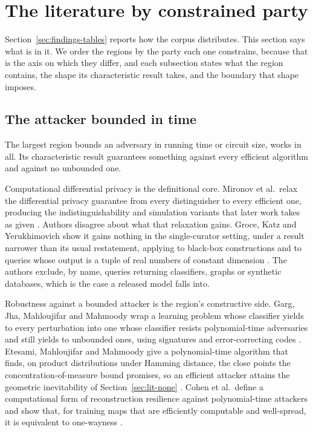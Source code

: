 \section{The literature by constrained party}
\label{sec:literature}

Section~\ref{sec:findings-tables} reports how the corpus distributes. This
section says what is in it. We order the regions by the party each one
constrains, because that is the axis on which they differ, and each subsection
states what the region contains, the shape its characteristic result takes,
and the boundary that shape imposes.

\subsection{The attacker bounded in time}

The largest region bounds an adversary in running time or circuit size,
\AttackerTimeCirc{} works in all. Its characteristic result guarantees
something against every efficient algorithm and against no unbounded one.

Computational differential privacy is the definitional core. Mironov et al.\
relax the differential privacy guarantee from every distinguisher to every
efficient one, producing the indistinguishability and simulation variants that
later work takes as given \cite{MPRV09}. Authors disagree about what that
relaxation gains. Groce, Katz and Yerukhimovich show it gains nothing in the
single-curator setting, under a result narrower than its usual restatement,
applying to black-box constructions and to queries whose output is a tuple of
real numbers of constant dimension \cite{GKY11}. The authors exclude, by name,
queries returning classifiers, graphs or synthetic databases, which is the
case a released model falls into.

Robustness against a bounded attacker is the region's constructive side. Garg,
Jha, Mahloujifar and Mahmoody wrap a learning problem whose classifier yields
to every perturbation into one whose classifier resists polynomial-time
adversaries and still yields to unbounded ones, using signatures and
error-correcting codes
\cite{GJMM20}. Etesami, Mahloujifar and Mahmoody give a polynomial-time
algorithm that finds, on product distributions under Hamming distance, the
close points the concentration-of-measure bound promises, so an efficient
attacker attains the geometric inevitability of Section~\ref{sec:lit-none}
\cite{EMM20}. Cohen et al.\ define a computational form of reconstruction
resilience against polynomial-time attackers and show that, for training maps
that are efficiently computable and well-spread, it is equivalent to
one-wayness
\cite{CKMMNST25}.

